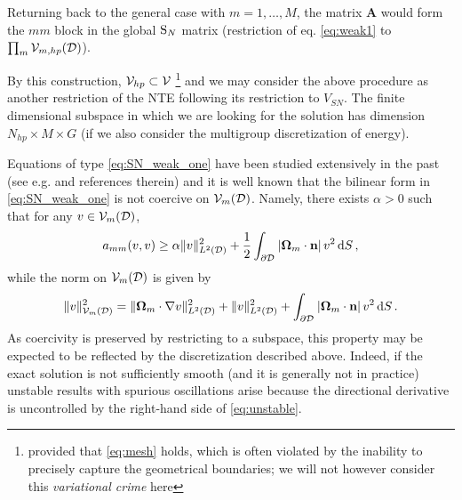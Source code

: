 \noindent Returning back to the general case with $m = 1,\ldots,M$, the matrix $\mathbf{A}$
would form the $mm$ block in the global $\SN$ matrix (restriction of eq. \eqref{eq:weak1} to $\prod_{m} \Space_{m,hp}(\VV)$).  

By this construction, $\Space_{hp} \subset \Space$ \footnote{provided that \eqref{eq:mesh} holds, which is often
violated by the inability to precisely capture the geometrical boundaries; we will not however consider this \textit{variational crime
} here} and we may consider the above procedure as another restriction of the NTE following its restriction to
$V_{SN}$.
The finite dimensional subspace in which we are looking for the solution has dimension $N_{hp} \times M \times G$ (if we also consider the multigroup discretization of energy).

Equations of type \eqref{eq:SN_weak_one} have been studied extensively in the past (see e.g. \cite{hartmann} and
references therein) and it is well known that the bilinear form in \eqref{eq:SN_weak_one} is not coercive on
$\Space_m(\VV)$. Namely, there exists $\alpha > 0$ such that for any $v \in \Space_m(\VV)$,
\begin{equation}\label{eq:unstable}
	a_{mm}(v,v) \geq \alpha \norm[{\Lp[2](\VV)}]{v}^2 + \frac{1}{2}\int_{\pV} \abs{\bomega_m\cdot\bn} v^2 \,\d{S},
\end{equation}
while the norm on $\Space_m(\VV)$ is given by
$$
	\norm[{\Space_m(\VV)}]{v}^2 = \norm[{\Lp[2](\VV)}]{\bomega_m\cdot\nabla v}^2 + \norm[{\Lp[2](\VV)}]{v}^2 +
	\int_{\pV} \abs{\bomega_m\cdot\bn} v^2 \,\d{S}. 
$$
As coercivity is preserved by restricting to a subspace, this property may be expected to be reflected by the
discretization described above. Indeed, if the exact solution is not sufficiently smooth (and it is generally not in
practice) unstable results with spurious oscillations arise because the directional derivative is uncontrolled by the
right-hand side of \eqref{eq:unstable}.

